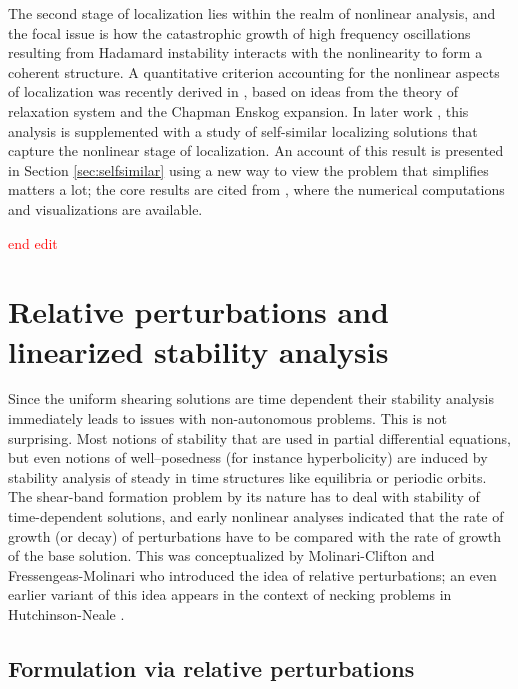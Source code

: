 \documentclass[a4paper,11pt]{article}
\newcommand{\tcr}{\textcolor{red}}
\theoremstyle{remark}
\begin{document}
The second stage of localization lies within the realm of nonlinear analysis, and the focal issue is how the catastrophic growth of high frequency oscillations resulting from Hadamard instability interacts with
the nonlinearity to form a coherent structure.
A quantitative criterion accounting for the nonlinear aspects of localization was recently derived in \cite{KT09},
based on ideas from the theory of relaxation system and the Chapman Enskog expansion. In later work
\cite{LKT17},  this analysis is supplemented with a study of self-similar localizing 
solutions that capture the nonlinear stage of localization. An account of this result is presented in Section \ref{sec:selfsimilar} using a new way to view the problem that simplifies matters a lot; the core results are cited from \cite{LKT17}, where the numerical computations and visualizations are available. %
 

\tcr{end edit}


\vfil\eject

\section{Relative perturbations and linearized stability analysis}
\label{sec:relative}

Since the uniform shearing solutions are time dependent their stability analysis immediately leads to issues with non-autonomous problems.
This is not surprising. Most notions of stability that are used in partial differential equations, but even notions of well--posedness 
(for instance hyperbolicity) are induced by stability analysis of steady in time structures like equilibria or periodic orbits.
The shear-band formation problem by its nature has to deal with stability of time-dependent solutions, and early nonlinear
analyses \cite{DH83,Tzavaras86a} indicated that the rate of growth (or decay) of perturbations have to be compared with the
rate of growth of the base solution. This was conceptualized  by Molinari-Clifton \cite{MC87} and Fressengeas-Molinari \cite{FM87} who
introduced the idea of relative perturbations; an even earlier variant of this idea appears in the context of necking
problems in Hutchinson-Neale \cite{HN77}.




\subsection{Formulation via relative perturbations}
\end{document}
